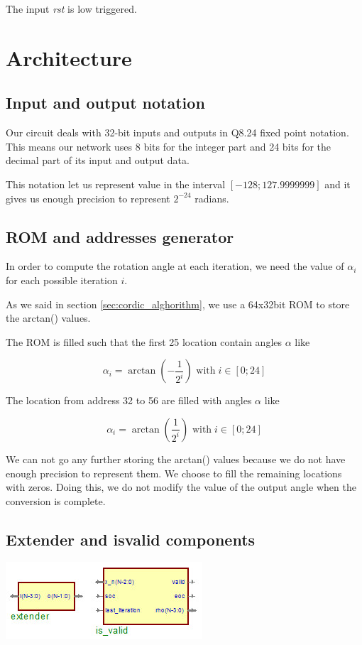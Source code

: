 \documentclass[12pt,a4paper]{report}
\begin{document}
The input \emph{rst} is low triggered.


\chapter{Architecture}

\section{Input and output notation}
Our circuit deals with 32-bit inputs and outputs in Q8.24 fixed point notation. This means our network uses 8 bits for the integer part and 24 bits for the decimal part of its input and output data.

This notation let us represent value in the interval $ \left[ -128; 127.9999999 \right]$ and it gives us enough precision to represent $2^{-24}$ radians.

\section{ROM and addresses generator}
In order to compute the rotation angle at each iteration, we need the value of $\alpha_{i}$ for each possible iteration $i$.

As we said in section \ref{sec:cordic_alghorithm}, we use a 64x32bit ROM to store the arctan() values.

The ROM is filled such that the first 25 location contain angles $\alpha$ like

\begin{equation}
\alpha_{i} = \arctan \left( - \dfrac{1}{2^{i}} \right) \mbox{ with} \; i \in \left[0; 24 \right]
\end{equation}

The location from address 32 to 56 are filled with angles $\alpha$ like

\begin{equation}
\alpha_{i} = \arctan \left(\dfrac{1}{2^{i}} \right) \mbox{ with} \; i \in \left[0; 24 \right]
\end{equation}

We can not go any further storing the arctan() values because we do not have enough precision to represent them. We choose to fill the remaining locations with zeros. Doing this, we do not modify the value of the output angle when the conversion is complete.

\section{Extender and is\textunderscore valid components}
\begin{center}
\includegraphics{img/isvalid.jpg}
\end{center}
\end{document}

